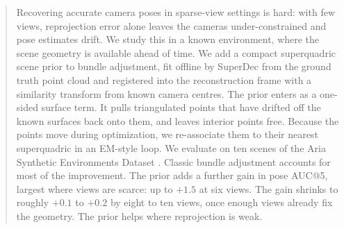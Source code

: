 \begin{abstract}
Recovering accurate camera poses in sparse-view settings is hard: with few views, reprojection error alone leaves the cameras under-constrained and pose estimates drift. We study this in a known environment, where the scene geometry is available ahead of time. We add a compact superquadric scene prior to bundle adjustment, fit offline by SuperDec \cite{fedele2026superdec3dscenedecomposition} from the ground truth point cloud and registered into the reconstruction frame with a similarity transform from known camera centres. The prior enters as a one-sided surface term. It pulls triangulated points that have drifted off the known surfaces back onto them, and leaves interior points free. Because the points move during optimization, we re-associate them to their nearest superquadric in an EM-style loop. We evaluate on ten scenes of the Aria Synthetic Environments Dataset \cite{avetisyan2024scenescriptreconstructingscenesautoregressive}. Classic bundle adjustment accounts for most of the improvement. The prior adds a further gain in pose AUC@5, largest where views are scarce: up to $+1.5$ at six views. The gain shrinks to roughly $+0.1$ to $+0.2$ by eight to ten views, once enough views already fix the geometry. The prior helps where reprojection is weak.
\end{abstract}
